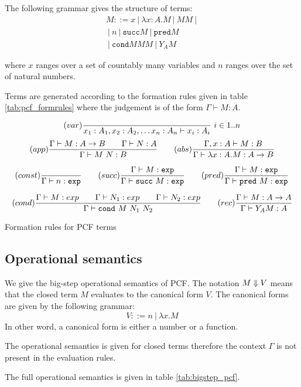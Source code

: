 The following grammar gives the structure of terms:
\begin{eqnarray*}
 M ::= x\ |\ \lambda x :A . M \ |\ M M \ |\ \\
\ |\ n \ |\ \texttt{succ} M \ |\  \texttt{pred} M \\
\ |\ \texttt{cond} M M M \ |\ Y_A M
\end{eqnarray*}

where $x$ ranges over a set of countably many variables and $n$
ranges over the set of natural numbers.

Terms are generated according to the formation rules given in table
\ref{tab:pcf_formrules} where the judgement is of the form $ \Gamma  \vdash M : A$.

\begin{table}[htbp]
$$ (var) \frac{\displaystyle }{x_1:A_1, x_2:A_2, \ldots x_n : A_n  \vdash x_i : A_i}\ i \in 1..n$$
$$ (app) \frac{\displaystyle \Gamma \vdash M : A\rightarrow B \qquad \Gamma \vdash N:A}{\Gamma \vdash M\ N : B}
\qquad (abs) \frac{\displaystyle \Gamma, x:A \vdash M : B}{\Gamma \vdash \lambda x :A . M : A\rightarrow B}$$

$$ (const) \frac{\displaystyle }{\Gamma \vdash n :\texttt{exp}}
\qquad (succ) \frac{\displaystyle \Gamma \vdash M:\texttt{exp} }{\Gamma \vdash \texttt{succ}\ M:\texttt{exp}}
\qquad (pred) \frac{\displaystyle \Gamma \vdash M:\texttt{exp} }{\Gamma \vdash \texttt{pred}\ M:\texttt{exp}}$$

$$
(cond) \frac{\displaystyle \Gamma \vdash M : exp \qquad \Gamma \vdash N_1 : exp \qquad \Gamma \vdash N_2 : exp }{\Gamma \vdash \texttt{cond}\ M\ N_1\ N_2}
\qquad  (rec) \frac{\displaystyle \Gamma \vdash M : A\rightarrow A }{ \Gamma \vdash Y_A M : A}$$

\caption{Formation rules for PCF terms}
\label{tab:pcf_formrules}
\end{table}

\subsection{Operational semantics}

We give the big-step operational semantics of PCF. The notation $M \Downarrow V$ means
that the closed term $M$ evaluates to the canonical form $V$. The canonical forms are given by the following
grammar:
$$V ::= n\ |\ \lambda x. M$$
In other word, a canonical form is either a number or a function.

The operational semantics is given for closed terms therefore the context $\Gamma$ is not present in
the evaluation rules.

The full operational semantics is given in table \ref{tab:bigstep_pcf}.

